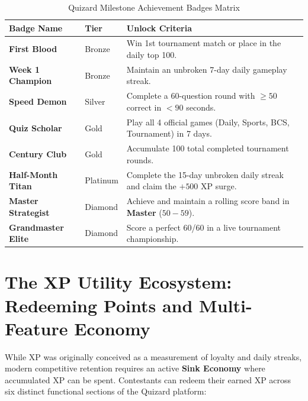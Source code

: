 \begin{table}[htbp]
\centering
\small
\begin{tabular}{|l|l|p{6.8cm}|}
\hline
\rowcolor{primaryBlue!15}
\textbf{Badge Name} & \textbf{Tier} & \textbf{Unlock Criteria} \\ \hline
\textbf{First Blood} & Bronze & Win 1st tournament match or place in the daily top 100. \\ \hline
\textbf{Week 1 Champion} & Bronze & Maintain an unbroken 7-day daily gameplay streak. \\ \hline
\textbf{Speed Demon} & Silver & Complete a 60-question round with $\ge 50$ correct in $< 90$ seconds. \\ \hline
\textbf{Quiz Scholar} & Gold & Play all 4 official games (Daily, Sports, BCS, Tournament) in 7 days. \\ \hline
\textbf{Century Club} & Gold & Accumulate 100 total completed tournament rounds. \\ \hline
\textbf{Half-Month Titan}& Platinum & Complete the 15-day unbroken daily streak and claim the $+500\text{ XP}$ surge. \\ \hline
\textbf{Master Strategist}& Diamond & Achieve and maintain a rolling score band in \textbf{Master} ($50-59$). \\ \hline
\textbf{Grandmaster Elite}& Diamond & Score a perfect 60/60 in a live tournament championship. \\ \hline
\end{tabular}
\caption{Quizard Milestone Achievement Badges Matrix}
\end{table}


\section{The XP Utility Ecosystem: Redeeming Points and Multi-Feature Economy}
While XP was originally conceived as a measurement of loyalty and daily streaks, modern competitive retention requires an active \textbf{Sink Economy} where accumulated XP can be spent. Contestants can redeem their earned XP across six distinct functional sections of the Quizard platform:

